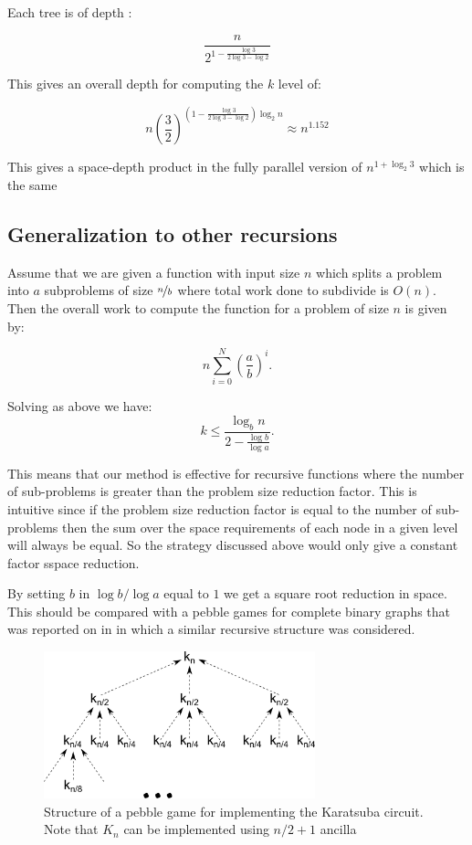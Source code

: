Each tree is of depth :

\[
    \frac{n}{2^{1-\frac{\log 3}{ 2\log 3 - \log 2}}}
\]

This gives an overall depth for computing the $k$ level of:

\[
    n\left(\frac{3}{2}\right)^{\left(1-\frac{\log 3}{ 2\log 3 - \log 2}\right)\log_2 n} \approx n^{1.152}
\]

This gives a space-depth product in the fully parallel version of $n^{1+\log_2
3}$ which is the same

\subsection{Generalization to other recursions}

Assume that we are given a function with input size $n$ which splits a problem
into $a$ subproblems of size $\nicefrac{n}{b}$ where total work done to
subdivide is $O(n)$. Then the overall work to compute the function for a
problem of size $n$ is given by:

\[
    n\sum_{i=0}^{N} \left(\frac{a}{b}\right)^i.
\]

Solving as above we have:
\[
    k \leq \frac{\log_b n}{ 2- \frac{\log b}{\log a}}.
\]

This means that our method is effective for recursive functions where the
number of sub-problems is greater than the problem size reduction factor. This
is intuitive since if the problem size reduction factor is equal to the number
of sub-problems then the sum over the space requirements of each node in a
given level will always be equal. So the strategy discussed above would only
give a constant factor sspace reduction.


By setting $b$ in $\log b / \log a$ equal to $1$ we get a square root
reduction in space. This should be compared with a pebble games for complete
binary graphs that was reported on in \cite{peb16} in which a similar
recursive structure was considered.



      \begin{figure}[p]
        \capstart
        \centering
        \includegraphics[width=0.7\textwidth]{images/kara-mdd}
        \caption{Structure of a pebble game for implementing the Karatsuba circuit. Note that $K_n$ can be implemented using $n/2+1$ ancilla}
        \label{fig:kara-mdd}
      \end{figure}

